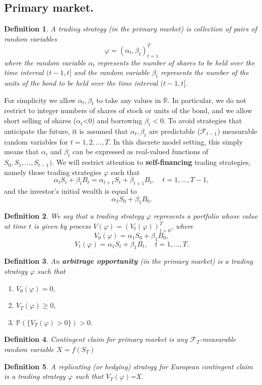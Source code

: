 \documentclass{book}
\newtheorem{definition}{Definition}[section]
\begin{document}
\subsection{Primary market.}
\begin{definition}
A trading strategy (in the primary market) is collection of pairs of random variables 
$$
\varphi=(\alpha_{t},\beta_{t})_{t=1}^{T}
$$
where the random variable $\alpha_{t}$ represents the number of shares to be held over the time interval $(t-1,t]$ and the random variable $\beta_{t}$ represents the number of the units of the bond to be held over the time interval $(t-1,t]$.
\end{definition}
For simplicity we allow $\alpha_{t},\beta_{t}$ to take any values in $\mathbb{R}.$ In particular, we do not restrict to integer numbers of shares of stock or units of the bond, and we allow short selling of shares ($\alpha_{t}$<0) and borrowing $\beta_{t}<0$. To avoid strategies that anticipate the future, it is assumed that $\alpha_{t},\beta_{t}$ are predictable ($\mathcal{F}_{t-1}$) measurable random variables for $t=1,2,\dots,T.$ In this discrete model setting, this simply means that $\alpha_{t}$ and $\beta_{t}$ can be expressed as real-valued functions of $S_{0},S_{1},\dots,S_{t-1}).$
We will restrict attention to \textbf{self-financing} trading strategies, namely those trading strategies $\varphi$ such that
$$
\alpha_{t}S_{t}+\beta_{t}B_{t}=\alpha_{t+1}S_{t}+\beta_{t+1}B_{t},\quad t=1,\dots,T-1,
$$
and the investor's initial wealth is equal to
$$
\alpha_{1}S_{0}+\beta_{1}B_{0}.
$$
\begin{definition}
We say that a trading strategy $\varphi$ represents a portfolio whose value at time $t$ is given by process $V(\varphi)=(V_{t}(\varphi))_{t=0}^{T}$, where
$$
V_{0}(\varphi)=\alpha_{1}S_{0}+\beta_{1}B_{0},
$$
$$
V_{t}(\varphi)=\alpha_{1}S_{t}+\beta_{1}B_{t},\quad t=1,\dots,T.
$$
\end{definition}
\begin{definition}
An \textbf{arbitrage opportunity} (in the primary market) is a trading strategy $\varphi$ such that
\begin{enumerate}
\item $V_{0}(\varphi)=0$,
\item $V_{T}(\varphi)\geq 0$,
\item $\mathbb{P}(\{V_{T}(\varphi)>0\})>0$.
\end{enumerate}
\end{definition}
\begin{definition}
Contingent claim for primary market is any $\mathcal{F}_{T}$-measurable random variable $X=f(S_{T})$
\end{definition}
\begin{definition}
A replicating (or hedging) strategy for European contingent claim is a trading strategy $\varphi$ such that $V_{T}(\varphi)$=X.
\end{definition}
\end{document}

